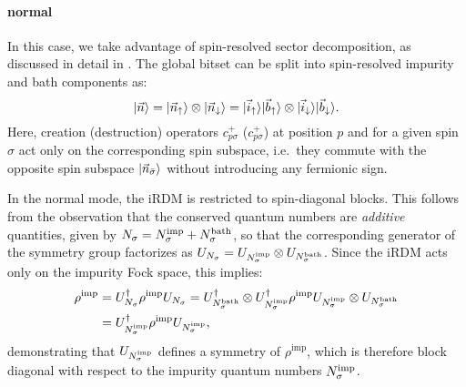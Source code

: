 \documentclass[edipack2.tex]{subfiles}
\begin{document}
\paragraph{{\bf normal}}
In this case, we take advantage of spin-resolved sector decomposition, 
as discussed in detail in 
. 
The global bitset can be split into spin-resolved 
impurity and bath components as:
\begin{equation}
|\vec{n}\rangle =
|\vec{n}_\uparrow\rangle\otimes |\vec{n}_\downarrow\rangle =
|\vec{i}_\uparrow\rangle|\vec{b}_\uparrow\rangle\otimes |\vec{i}_\downarrow\rangle|\vec{b}_\downarrow\rangle.
\end{equation}
Here, creation (destruction) operators  $c^+_{p\sigma}$
($c^+_{p\sigma}$) at position $p$ and for a given spin $\sigma$
act only on the corresponding 
spin subspace, i.e.~they commute with the opposite spin 
subspace $|\vec{n}_{\bar{\sigma}}\rangle$ without introducing any 
fermionic sign.

In the {normal} mode, the iRDM is restricted to 
{spin-diagonal} blocks. This follows from the observation 
that the conserved quantum numbers are 
\emph{additive} quantities, given by
$N_\sigma = N_\sigma^\mathrm{imp} + N_\sigma^\mathrm{bath}$,
so that the corresponding generator of the symmetry group factorizes as
$U_{N_\sigma} = U_{N_\sigma^\mathrm{imp}} \otimes U_{N_\sigma^\mathrm{bath}}$. 
Since the iRDM acts only on the impurity Fock space, this implies:
\begin{equation}
\begin{aligned}
\rho^\mathrm{imp} &= U_{N_\sigma}^\dagger \rho^\mathrm{imp} U_{N_\sigma} = 
U_{N_\sigma^\mathrm{bath}}^\dagger \otimes U_{N_\sigma^\mathrm{imp}}^\dagger 
\rho^\mathrm{imp} 
U_{N_\sigma^\mathrm{imp}} \otimes U_{N_\sigma^\mathrm{bath}} \\
&= 
U_{N_\sigma^\mathrm{imp}}^\dagger \rho^\mathrm{imp} U_{N_\sigma^\mathrm{imp}},
\end{aligned}
\end{equation}
demonstrating that $U_{N_\sigma^\mathrm{imp}}$ defines a symmetry of 
$\rho^\mathrm{imp}$, which is therefore block diagonal with respect to 
the impurity quantum numbers $N_\sigma^\mathrm{imp}$.
\end{document}
